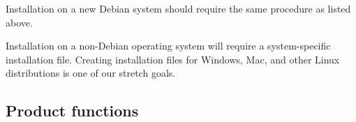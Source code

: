 Installation on a new Debian system should require the same procedure as listed above.

Installation on a non-Debian operating system will require a system-specific installation file.
Creating installation files for Windows, Mac, and other Linux distributions is one of our stretch goals. 


\subsection{Product functions}
% 

